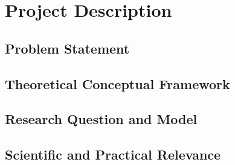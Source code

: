 \chapter{Project Description}

\section{Problem Statement}


\section{Theoretical Conceptual Framework}


\section{Research Question and Model}


\section{Scientific and Practical Relevance}

